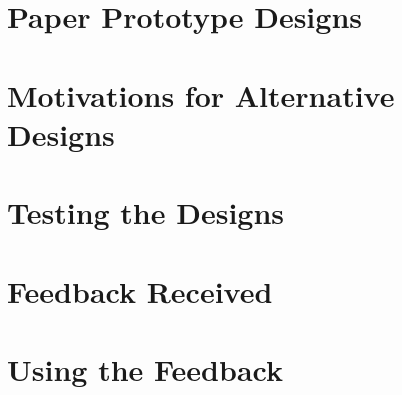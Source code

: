 \documentclass[11pt]{article}
\begin{document}


\tableofcontents

\newpage

\section{Paper Prototype Designs}


\newpage

\section{Motivations for Alternative Designs}

\section{Testing the Designs}

\section{Feedback Received}

\section{Using the Feedback}
	
\end{document}
